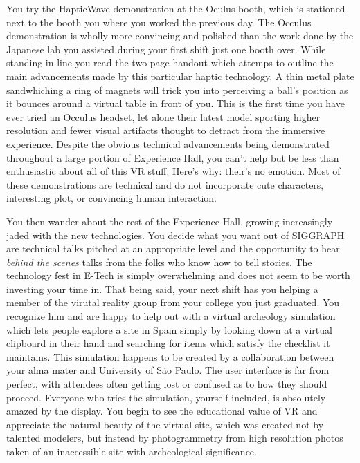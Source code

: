 \documentclass[../main.tex]{subfiles}
\begin{document}
You try the HapticWave demonstration at the Oculus booth, which is stationed next to the booth you where you worked the previous day. The Occulus demonstration is wholly more convincing and polished than the work done by the Japanese lab you assisted during your first shift just one booth over. While standing in line you read the two page handout which attemps to outline the main advancements made by this particular haptic technology. A thin metal plate sandwhiching a ring of magnets will trick you into perceiving a ball's position as it bounces around a virtual table in front of you. This is the first time you have ever tried an Occulus headset, let alone their latest model sporting higher resolution and fewer visual artifacts thought to detract from the immersive experience. Despite the obvious technical advancements being demonstrated throughout a large portion of Experience Hall, you can't help but be less than enthusiastic about all of this VR stuff. Here's why: their's no emotion. Most of these demonstrations are technical and do not incorporate cute characters, interesting plot, or convincing human interaction.

You then wander about the rest of the Experience Hall, growing increasingly jaded with the new technologies. You decide what you want out of SIGGRAPH are technical talks pitched at an appropriate level and the opportunity to hear \textit{behind the scenes} talks from the folks who know how to tell stories. The technology fest in E-Tech is simply overwhelming and does not seem to be worth investing your time in. That being said, your next shift has you helping a member of the virutal reality group from your college you just graduated. You recognize him and are happy to help out with a virtual archeology simulation which lets people explore a site in Spain simply by looking down at a virtual clipboard in their hand and searching for items which satisfy the checklist it maintains. This simulation happens to be created by a collaboration between your alma mater and University of São Paulo. The user interface is far from perfect, with attendees often getting lost or confused as to how they should proceed. Everyone who tries the simulation, yourself included, is absolutely amazed by the display. You begin to see the educational value of VR and appreciate the natural beauty of the virtual site, which was created not by talented modelers, but instead by photogrammetry from high resolution photos taken of an inaccessible site with archeological significance.
\end{document}
